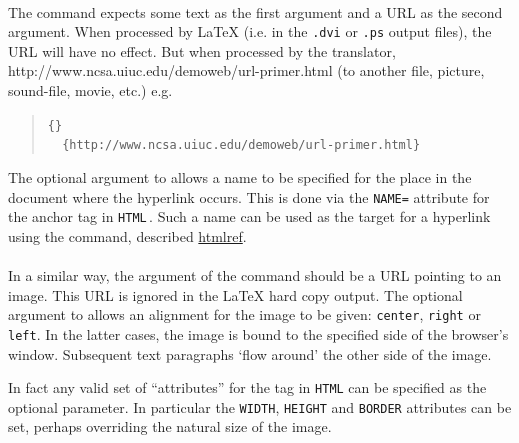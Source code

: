 %
%
\paragraph*{\label{addnormlink}}
The  command expects some text as the first argument 
and a URL as the second argument. 
When processed by \LaTeX{}  (i.e. in the \texttt{.dvi} or \texttt{.ps} output files), 
the URL will have no effect. But when processed by the translator, 
{http://www.ncsa.uiuc.edu/demoweb/url-primer.html} 
(to another file, picture, sound-file, movie, etc.) e.g.
\begin{quote}
\begin{small}
\verb|{|\verb|}|\\
\verb|  {http://www.ncsa.uiuc.edu/demoweb/url-primer.html}|
\end{small}
\end{quote}

%
\noindent
The optional argument to  allows a name to be
specified for the place in the document where the hyperlink occurs.
This is done via the \texttt{NAME=}\texttt{} attribute
for the  anchor tag in \texttt{HTML}\,. 
Such a name can be used as the target for a hyperlink using the  command, 
described \hyperref{later}{in Section~}{}{htmlref}.


%
\paragraph*{\label{htmladdimg}}
In a similar way, the argument of the  command 
should be a URL pointing to an image. 
This URL is ignored in the \LaTeX{}  hard copy output. 
The optional argument to  allows an alignment
for the image to be given:  \texttt{center}, \texttt{right} or \texttt{left}.
In the latter cases, the image is bound to the specified side
of the browser's window. Subsequent text paragraphs `flow around' the
other side of the image.

\html{\\}
%
In fact any valid set of ``attributes'' for the  tag in \texttt{HTML} 
can be specified as the optional  parameter. In particular
the \texttt{WIDTH}, \texttt{HEIGHT} and \texttt{BORDER} attributes can be set,
perhaps overriding the natural size of the image.

